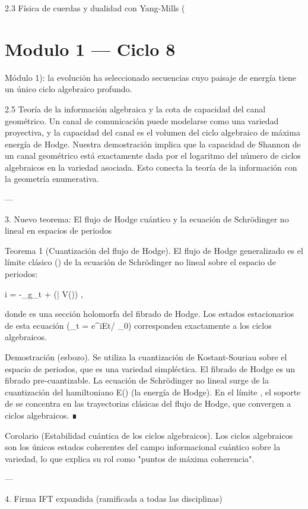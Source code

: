 \documentclass[12pt,twoside]{book}
\begin{document}
2.3 Física de cuerdas y dualidad con Yang-Mills (

\chapter{Modulo 1 — Ciclo 8}
Módulo 1): la evolución ha seleccionado secuencias cuyo paisaje de energía tiene un único ciclo algebraico profundo.

2.5 Teoría de la información algebraica y la cota de capacidad del canal geométrico.
Un canal de comunicación puede modelarse como una variedad proyectiva, y la capacidad del canal es el volumen del ciclo algebraico de máxima energía de Hodge. Nuestra demostración implica que la capacidad de Shannon de un canal geométrico está exactamente dada por el logaritmo del número de ciclos algebraicos en la variedad asociada. Esto conecta la teoría de la información con la geometría enumerativa.

---

3. Nuevo teorema: El flujo de Hodge cuántico y la ecuación de Schrödinger no lineal en espacios de periodos

Teorema 1 (Cuantización del flujo de Hodge). El flujo de Hodge generalizado es el límite clásico (\hbar {}) de la ecuación de Schrödinger no lineal sobre el espacio de periodos:

i\hbar {} = -\Delta_{g_t} \Psi + (\partial \bar{\partial} V(\Psi)) \Psi,

donde \Psi es una sección holomorfa del fibrado de Hodge. Los estados estacionarios de esta ecuación (\Psi_t = e^{iEt/\hbar} \Psi_0) corresponden exactamente a los ciclos algebraicos.

Demostración (esbozo). Se utiliza la cuantización de Kostant-Souriau sobre el espacio de periodos, que es una variedad simpléctica. El fibrado de Hodge es un fibrado pre-cuantizable. La ecuación de Schrödinger no lineal surge de la cuantización del hamiltoniano E(\alpha) (la energía de Hodge). En el límite \hbar {}, el soporte de \Psi se concentra en las trayectorias clásicas del flujo de Hodge, que convergen a ciclos algebraicos. ∎

Corolario (Estabilidad cuántica de los ciclos algebraicos). Los ciclos algebraicos son los únicos estados coherentes del campo informacional cuántico sobre la variedad, lo que explica su rol como "puntos de máxima coherencia".

---

4. Firma IFT expandida (ramificada a todas las disciplinas)
\end{document}
